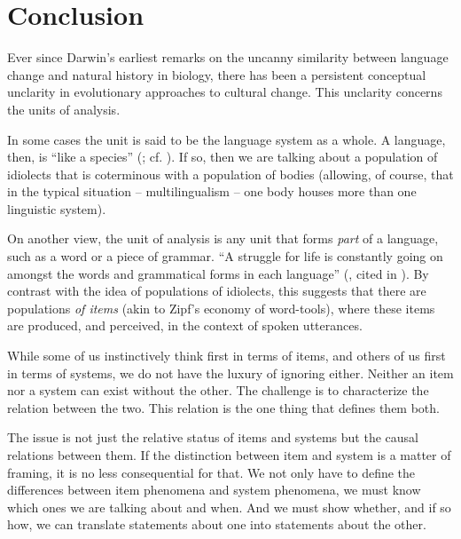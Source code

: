 \chapter{Conclusion}



Ever since Darwin's earliest remarks on the uncanny similarity between 
language change and natural history in biology, there has been a 
persistent conceptual unclarity in evolutionary approaches to cultural 
change. This unclarity concerns the units of analysis. 



In some cases the unit is said to be the language system as a whole. A 
language, then, is ``like a species'' (\citealt[60]{darwin_descent_1871}; cf. \citealt[192--194]{mufwene_ecology_2001}). If so, then we are talking about a population 
of idiolects that is coterminous with a population of bodies (allowing, 
of course, that in the typical situation -- multilingualism -- one body houses 
more than one linguistic system). 



On another view, the unit of analysis is any unit that forms \textit{part} of a language, such as a word or a piece of grammar. ``A struggle 
for life is constantly going on amongst the words and grammatical forms 
in each language'' (\citealt{muller_darwinism_1870}, cited in \citealt[60]{darwin_descent_1871}). By
contrast with the idea of populations of idiolects, this suggests that 
there are populations \textit{of items }(akin to Zipf's economy of 
word-tools), where these items are produced, and perceived, in the 
context of spoken utterances. 



While some of us instinctively think first in terms of items, and others 
of us first in terms of systems, we do not have the luxury of ignoring either. 
Neither an item nor a system can exist without the other. The challenge 
is to characterize the relation between the two. This relation is the 
one thing that defines them both. 



The issue is not just the relative status of items and systems but the 
causal relations between them. If the distinction 
between item and system is a matter of framing, it is no less 
consequential for that. We not only have to define the differences 
between item phenomena and system phenomena, we must know which ones we 
are talking about and when. And we must show whether, and if so how, we 
can translate statements about one into statements about the other. 

